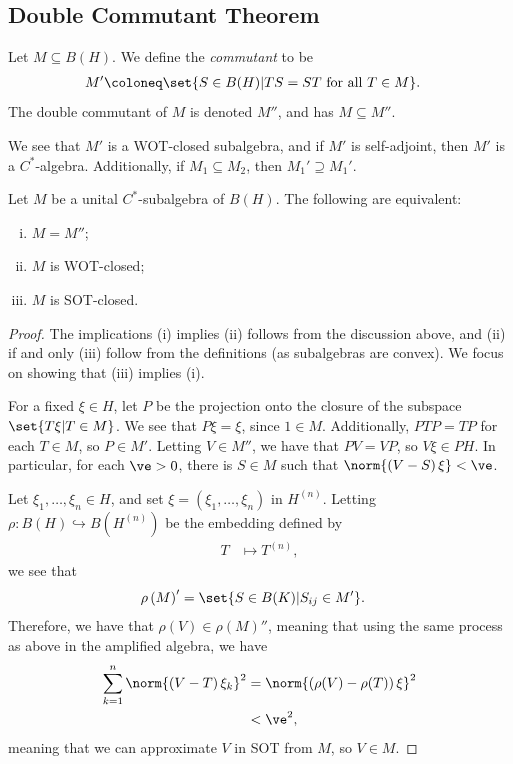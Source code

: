 \documentclass[10pt]{mypackage}
\begin{document}
\subsection{Double Commutant Theorem}%
\begin{definition}
  Let $M\subseteq B(H)$. We define the \textit{commutant} to be
  \begin{align*}
    M' &\coloneq \set{S\in B(H) | TS = ST\text{ for all }T\in M}.
  \end{align*}
  The double commutant of $M$ is denoted $M''$, and has $M\subseteq M''$.
\end{definition}
We see that $M'$ is a WOT-closed subalgebra, and if $M'$ is self-adjoint, then $M'$ is a $C^{\ast}$-algebra. Additionally, if $M_1\subseteq M_2$, then $M_1'\supseteq M_1'$.
\begin{theorem}
  Let $M$ be a unital $C^{\ast}$-subalgebra of $B(H)$. The following are equivalent:
  \begin{enumerate}[(i)]
    \item $M = M''$;
    \item $M$ is WOT-closed;
    \item $M$ is SOT-closed.
  \end{enumerate}
\end{theorem}
\begin{proof}
  The implications (i) implies (ii) follows from the discussion above, and (ii) if and only (iii) follow from the definitions (as subalgebras are convex). We focus on showing that (iii) implies (i).

  For a fixed $\xi\in H$, let $P$ be the projection onto the closure of the subspace $\set{T\xi | T\in M}$. We see that $P\xi = \xi$, since $1 \in M$. Additionally, $PTP = TP$ for each $T\in M$, so $P\in M'$. Letting $V\in M''$, we have that $PV = VP$, so $V\xi \in PH$. In particular, for each $\ve > 0$, there is $S\in M$ such that $\norm{\left( V-S \right)\xi} < \ve$.

  Let $\xi_1,\dots,\xi_n\in H$, and set $\xi = \left( \xi_1,\dots,\xi_n \right)$ in $H^{(n)}$. Letting $\rho\colon B(H)\hookrightarrow B\left(H^{(n)}\right)$ be the embedding defined by
  \begin{align*}
    T &\mapsto T^{(n)},
  \end{align*}
  we see that
  \begin{align*}
    \rho\left( M \right)' &= \set{S\in B(K)| S_{ij}\in M'}.
  \end{align*}
  Therefore, we have that $\rho(V)\in \rho(M)''$, meaning that using the same process as above in the amplified algebra, we have
  \begin{align*}
    \sum_{k=1}^{n} \norm{\left( V-T \right)\xi_k}^2 &= \norm{\left( \rho(V)-\rho(T) \right)\xi}^2\\
                                                    &< \ve^2,
  \end{align*}
  meaning that we can approximate $V$ in SOT from $M$, so $V\in M$.
\end{proof}
\end{document}
